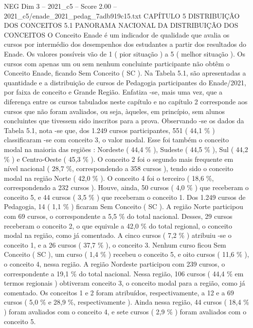 \begin{textsample}{NEG Dim 3 – 2021\_c5 – Score 2.00 – 2021\_c5/enade\_2021\_pedag\_7adb919c15.txt}  \label{ex:f3_neg_196}
CAPÍTULO 5 DISTRIBUIÇÃO DOS CONCEITOS 5.1 PANORAMA NACIONAL DA DISTRIBUIÇÃO DOS CONCEITOS O Conceito Enade é um indicador de qualidade que avalia os cursos por intermédio dos desempenhos dos estudantes a partir dos resultados do Enade.
Os valores possíveis vão de 1 ( pior situação ) a 5 ( melhor situação ).
Os cursos com apenas um ou sem nenhum concluinte participante não obtêm o Conceito Enade, ficando Sem Conceito ( SC ).
Na Tabela 5.1, são apresentadas a quantidade e a distribuição de cursos de Pedagogia participantes do Enade/2021, por faixa de conceito e Grande Região.
Enfatiza -se, mais uma vez, que a diferença entre os cursos tabulados neste capítulo e no capítulo 2 corresponde aos cursos que não foram avaliados, ou seja, àqueles, em princípio, sem alunos concluintes que tivessem sido inscritos para a prova.
Observando -se os dados da Tabela 5.1, nota -se que, dos 1.249 cursos participantes, 551 ( 44,1 \% ) classificaram -se com conceito 3, o valor modal.
Esse foi também o conceito modal na maioria das regiões : Nordeste ( 44,4 \% ), Sudeste ( 44,5 \% ), Sul ( 44,2 \% ) e Centro-Oeste ( 45,3 \% ).
O conceito 2 foi o segundo mais frequente em nível nacional ( 28,7 \%, correspondendo a 358 cursos ), tendo sido o conceito modal na região Norte ( 42,0 \% ).
O conceito 4 foi o terceiro ( 18,6 \%, correspondendo a 232 cursos ).
Houve, ainda, 50 cursos ( 4,0 \% ) que receberam o conceito 5, e 44 cursos ( 3,5 \% ) que receberam o conceito 1.
Dos 1.249 cursos de Pedagogia, 14 ( 1,1 \% ) ficaram Sem Conceito ( SC ).
A região Norte participou com 69 cursos, o correspondente a 5,5 \% do total nacional.
Desses, 29 cursos receberam o conceito 2, o que equivale a 42,0 \% do total regional, o conceito modal na região, como já comentado.
A cinco cursos ( 7,2 \% ) atribuiu -se o conceito 1, e a 26 cursos ( 37,7 \% ), o conceito 3.
Nenhum curso ficou Sem Conceito ( SC ), um curso ( 1,4 \% ) recebeu o conceito 5, e oito cursos ( 11,6 \% ), o conceito 4, nessa região.
A região Nordeste participou com 239 cursos, o correspondente a 19,1 \% do total nacional.
Nessa região, 106 cursos ( 44,4 \% em termos regionais ) obtiveram conceito 3, o conceito modal para a região, como já comentado.
Os conceitos 1 e 2 foram atribuídos, respectivamente, a 12 e a 69 cursos ( 5,0 \% e 28,9 \%, respectivamente ).
Ainda nessa região, 44 cursos ( 18,4 \% ) foram avaliados com o conceito 4, e sete cursos ( 2,9 \% ) foram avaliados com o conceito 5.

\end{textsample}
